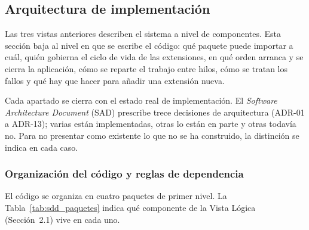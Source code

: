 \documentclass[12pt,letterpaper,oneside]{article}
\DeclareRobustCommand{\_}{\textunderscore\allowbreak}
\begin{document}
\subsection{Arquitectura de implementación}
\label{sec:sdd_arq_impl}

Las tres vistas anteriores describen el sistema a nivel de componentes. Esta sección baja al nivel en que se escribe el código: qué paquete puede importar a cuál, quién gobierna el ciclo de vida de las extensiones, en qué orden arranca y se cierra la aplicación, cómo se reparte el trabajo entre hilos, cómo se tratan los fallos y qué hay que hacer para añadir una extensión nueva.

Cada apartado se cierra con el estado real de implementación. El \textit{Software Architecture Document} (SAD) prescribe trece decisiones de arquitectura (ADR-01 a ADR-13); varias están implementadas, otras lo están en parte y otras todavía no. Para no presentar como existente lo que no se ha construido, la distinción se indica en cada caso.

\subsubsection{Organización del código y reglas de dependencia}

El código se organiza en cuatro paquetes de primer nivel. La Tabla~\ref{tab:sdd_paquetes} indica qué componente de la Vista Lógica (Sección~2.1) vive en cada uno.
\end{document}
